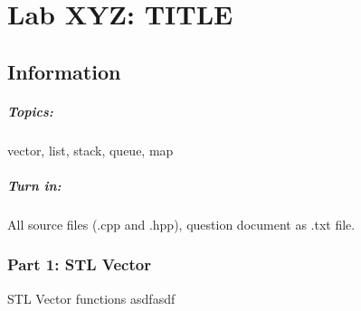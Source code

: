 \documentclass[a4paper,12pt]{book}
\title{}
\author{Rachel Morris}
\date{\today}
\begin{document}
    \chapter*{Lab XYZ: TITLE} 
        \section*{Information}
            \paragraph{ Topics: } vector, list, stack, queue, map
            \paragraph{ Turn in: } All source files (.cpp and .hpp), question document as .txt file. 


            \subsection*{Part 1: STL Vector}
            
                \begin{intro}{STL Vector functions}
                    asdfasdf
                \end{intro}
\end{document}
